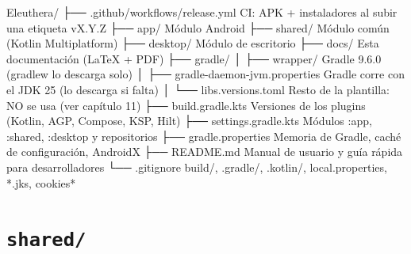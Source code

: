 \documentclass[11pt,a4paper,oneside]{report}
\newcommand{\cod}[1]{\texttt{\small #1}}
\begin{document}
\begin{arbol}
\begin{literal}
Eleuthera/
├── .github/workflows/release.yml   CI: APK + instaladores al subir una etiqueta vX.Y.Z
├── app/                            Módulo Android
├── shared/                         Módulo común (Kotlin Multiplatform)
├── desktop/                        Módulo de escritorio
├── docs/                           Esta documentación (LaTeX + PDF)
├── gradle/
│   ├── wrapper/                    Gradle 9.6.0 (gradlew lo descarga solo)
│   ├── gradle-daemon-jvm.properties  Gradle corre con el JDK 25 (lo descarga si falta)
│   └── libs.versions.toml          Resto de la plantilla: NO se usa (ver capítulo 11)
├── build.gradle.kts                Versiones de los plugins (Kotlin, AGP, Compose, KSP, Hilt)
├── settings.gradle.kts             Módulos :app, :shared, :desktop y repositorios
├── gradle.properties               Memoria de Gradle, caché de configuración, AndroidX
├── README.md                       Manual de usuario y guía rápida para desarrolladores
└── .gitignore                      build/, .gradle/, .kotlin/, local.properties, *.jks, cookies*
\end{literal}
\end{arbol}

\section{\texorpdfstring{\cod{shared/}}{shared/}}
\end{document}

